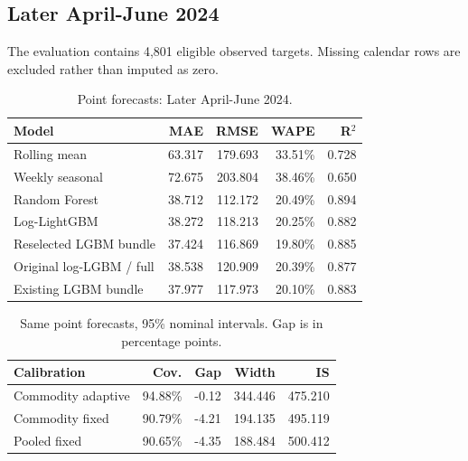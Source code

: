 \documentclass[conference]{IEEEtran}
\begin{document}
\subsection{Later April-June 2024}
The evaluation contains 4,801 eligible observed targets. Missing calendar rows are excluded rather than imputed as zero.
\begin{table}[!ht]\centering\small\caption{Point forecasts: Later April-June 2024.}\begin{tabular}{lrrrr}
\toprule
Model & MAE & RMSE & WAPE & R$^2$ \\
\midrule
Rolling mean & 63.317 & 179.693 & 33.51\% & 0.728 \\
Weekly seasonal & 72.675 & 203.804 & 38.46\% & 0.650 \\
Random Forest & 38.712 & 112.172 & 20.49\% & 0.894 \\
Log-LightGBM & 38.272 & 118.213 & 20.25\% & 0.882 \\
Reselected LGBM bundle & 37.424 & 116.869 & 19.80\% & 0.885 \\
Original log-LGBM / full & 38.538 & 120.909 & 20.39\% & 0.877 \\
Existing LGBM bundle & 37.977 & 117.973 & 20.10\% & 0.883 \\
\bottomrule
\end{tabular}
\end{table}
\begin{table}[!ht]\centering\small\caption{Same point forecasts, 95\% nominal intervals. Gap is in percentage points.}\begin{tabular}{lrrrr}
\toprule
Calibration & Cov. & Gap & Width & IS \\
\midrule
Commodity adaptive & 94.88\% & -0.12 & 344.446 & 475.210 \\
Commodity fixed & 90.79\% & -4.21 & 194.135 & 495.119 \\
Pooled fixed & 90.65\% & -4.35 & 188.484 & 500.412 \\
\bottomrule
\end{tabular}
\end{table}
\end{document}
